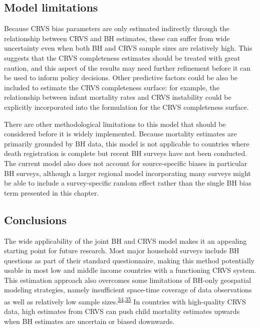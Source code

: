 \documentclass[
]{article}
\begin{document}
\hypertarget{model-limitations}{%
\subsection{Model limitations}\label{model-limitations}}

Because CRVS bias parameters are only estimated indirectly through the relationship between CRVS and BH estimates, these can suffer from wide uncertainty even when both BH and CRVS sample sizes are relatively high. This suggests that the CRVS completeness estimates should be treated with great caution, and this aspect of the results may need further refinement before it can be used to inform policy decisions. Other predictive factors could be also be included to estimate the CRVS completeness surface: for example, the relationship between infant mortality rates and CRVS instability could be explicitly incorporated into the formulation for the CRVS completeness surface.

There are other methodological limitations to this model that should be considered before it is widely implemented. Because mortality estimates are primarily grounded by BH data, this model is not applicable to countries where death registration is complete but recent BH surveys have not been conducted. The current model also does not account for source-specific biases in particular BH surveys, although a larger regional model incorporating many surveys might be able to include a survey-specific random effect rather than the single BH bias term presented in this chapter.

\hypertarget{conclusions}{%
\subsection{Conclusions}\label{conclusions}}

The wide applicability of the joint BH and CRVS model makes it an appealing starting point for future research. Most major household surveys include BH questions as part of their standard questionnaire, making this method potentially usable in most low and middle income countries with a functioning CRVS system. This estimation approach also overcomes some limitations of BH-only geospatial modeling strategies, namely insufficient space-time coverage of data observations as well as relatively low sample sizes.\textsuperscript{\protect\hyperlink{ref-Burstein2019}{34},\protect\hyperlink{ref-Wakefield2019}{35}} In countries with high-quality CRVS data, high estimates from CRVS can push child mortality estimates upwards when BH estimates are uncertain or biased downwards.
\end{document}

